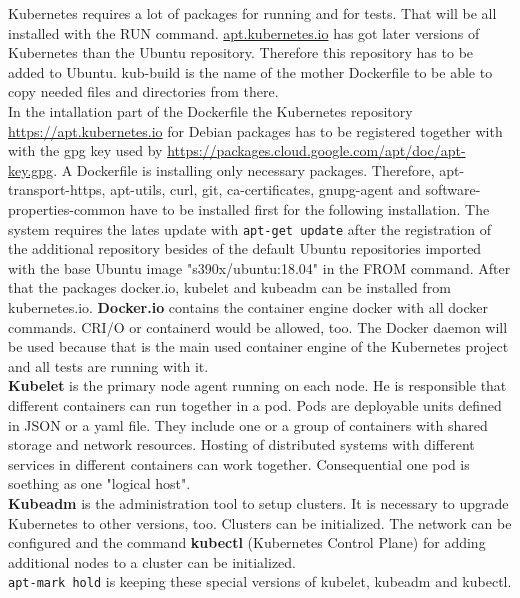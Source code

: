 Kubernetes requires a lot of packages for running and for tests. That will be all installed with the RUN command.
\url{apt.kubernetes.io} has got later versions of Kubernetes than the Ubuntu repository. Therefore this repository has to be added to Ubuntu. kub-build is the name of the mother Dockerfile to be able to copy needed files and directories from there. \\
In the intallation part of the Dockerfile the Kubernetes repository \url{https://apt.kubernetes.io} for Debian packages has to be registered together with with the gpg key used by  \url{https://packages.cloud.google.com/apt/doc/apt-key.gpg}.
A Dockerfile is installing only necessary packages. Therefore, apt-transport-https, apt-utils, curl, git, ca-certificates, gnupg-agent and software-properties-common have to be installed first for the following installation.
The system requires the lates update with \lstinline!apt-get update! after the registration of the additional repository besides of the default Ubuntu repositories imported with the base Ubuntu image "s390x/ubuntu:18.04" in the FROM command. After that the packages docker.io, kubelet and kubeadm can be installed from kubernetes.io. \textbf{Docker.io} contains the container engine docker with all docker commands. CRI/O or containerd would be allowed, too. 
The Docker daemon will be used because that is the main used container engine of the Kubernetes project and all tests are running with it. \\ \textbf{Kubelet} is the primary node agent running on each node. He is responsible that different containers can run together in a pod. Pods are deployable units defined in JSON or a yaml file. 
They include one or a group of containers with shared storage and network resources. Hosting of distributed systems  with different services in different containers can work together. Consequential one pod is soething as one "logical host". \\
\textbf{Kubeadm} is the administration tool to setup clusters. It is necessary to upgrade Kubernetes to other versions, too. Clusters can be initialized. The network can be configured and the command \textbf{kubectl} (Kubernetes Control Plane) for adding additional nodes to a cluster can be initialized. \\
\lstinline!apt-mark hold! is keeping these special versions of kubelet, kubeadm and kubectl. 


